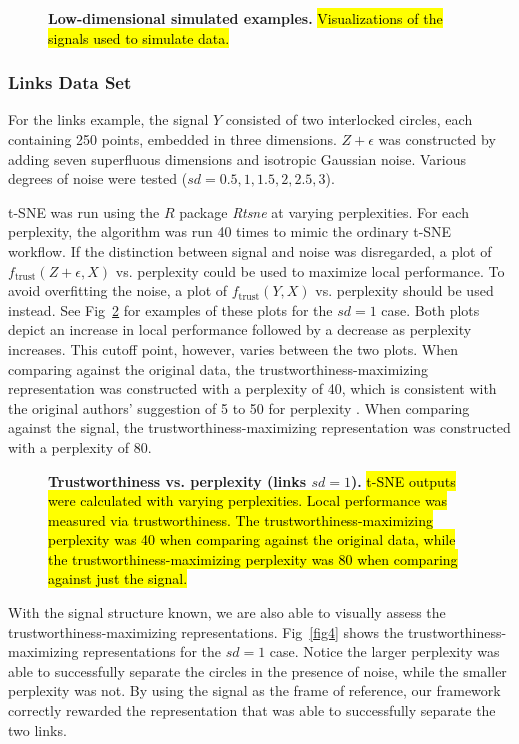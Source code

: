 \documentclass[10pt,letterpaper]{article}
\begin{document}
\begin{figure}[!h]
\caption{{\bf Low-dimensional simulated examples.}
\hl{Visualizations of the signals used to simulate data.}}
\label{fig2}
\end{figure}

\subsubsection*{Links Data Set}
For the links example, the signal $Y$ consisted of two interlocked circles, each containing 250 points, embedded in three dimensions. $Z + \epsilon$ was constructed by adding seven superfluous dimensions and isotropic Gaussian noise. Various degrees of noise were tested ($sd = 0.5, 1, 1.5, 2, 2.5, 3$).

t-SNE was run using the $R$ package \textit{Rtsne} \cite{Rtsne} at varying perplexities. For each perplexity, the algorithm was run 40 times to mimic the ordinary t-SNE workflow. If the distinction between signal and noise was disregarded, a plot of $f_\textrm{trust}(Z + \epsilon, X)$ vs. perplexity could be used to maximize local performance. To avoid overfitting the noise, a plot of $f_\textrm{trust}(Y, X)$ vs. perplexity should be used instead. See Fig~\ref{fig3} for examples of these plots for the $sd = 1$ case. Both plots depict an increase in local performance followed by a decrease as perplexity increases. This cutoff point, however, varies between the two plots. When comparing against the original data, the trustworthiness-maximizing representation was constructed with a perplexity of 40, which is consistent with the original authors' suggestion of 5 to 50 for perplexity \cite{t-SNE}. When comparing against the signal, the trustworthiness-maximizing representation was constructed with a perplexity of 80.

\begin{figure}[!h]
\caption{{\bf Trustworthiness vs. perplexity (links $sd = 1$).}
\hl{t-SNE outputs were calculated with varying perplexities. Local performance was measured via trustworthiness. The trustworthiness-maximizing perplexity was 40 when comparing against the original data, while the trustworthiness-maximizing perplexity was 80 when comparing against just the signal.}}
\label{fig3}
\end{figure}

With the signal structure known, we are also able to visually assess the trustworthiness-maximizing representations. Fig~\ref{fig4} shows the trustworthiness-maximizing representations for the $sd = 1$ case. Notice the larger perplexity was able to successfully separate the circles in the presence of noise, while the smaller perplexity was not. By using the signal as the frame of reference, our framework correctly rewarded the representation that was able to successfully separate the two links.
\end{document}
